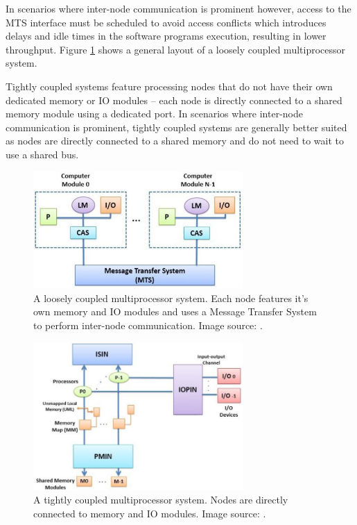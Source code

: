 In scenarios where inter-node communication is prominent however, access to the MTS interface must be scheduled to avoid access conflicts which introduces delays and idle times in the software programs execution, resulting in lower throughput. Figure \ref{fig:loose} shows a general layout of a loosely coupled multiprocessor system.

Tightly coupled systems feature processing nodes that do not have their own dedicated memory or IO modules -- each node is directly connected to a shared memory module using a dedicated  port. In scenarios where inter-node communication is prominent, tightly coupled systems are generally better suited as nodes are directly connected to a shared memory and do not need to wait to use a shared bus.

\begin{minipage}{0.45\textwidth}
\begin{figure}[H]
\centering
\includegraphics[width=8cm]{../img/loose}
\caption{A loosely coupled multiprocessor system. Each node features it's own memory and IO modules and uses a Message Transfer System to perform inter-node communication. Image source: \cite{preeti_aritra_2017}.}
\label{fig:loose}
\end{figure}
\end{minipage}
\begin{minipage}{0.05\textwidth}\hfill\end{minipage}
\begin{minipage}{0.45\textwidth}
\begin{figure}[H]
\centering
\includegraphics[width=8cm]{../img/tight}
\caption{A tightly coupled multiprocessor system. Nodes are directly connected to memory and IO modules. Image source: \cite{preeti_aritra_2017}.}
\label{fig:tight}
\end{figure}
\end{minipage}
\vspace{0.3cm}

